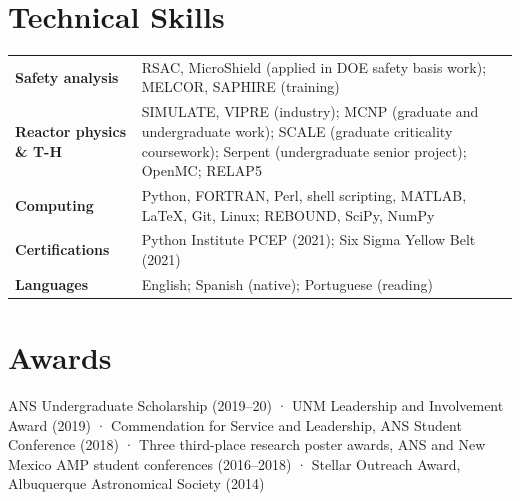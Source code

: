 \documentclass[10pt,letterpaper]{article}
\begin{document}
\section{Technical Skills}
\begin{tabularx}{\linewidth}{@{}lX@{}}
\textbf{Safety analysis} & RSAC, MicroShield (applied in DOE safety basis work); MELCOR, SAPHIRE (training)\\
\textbf{Reactor physics \& T-H} & SIMULATE, VIPRE (industry); MCNP (graduate and undergraduate work); SCALE (graduate criticality coursework); Serpent (undergraduate senior project); OpenMC; RELAP5\\
\textbf{Computing} & Python, FORTRAN, Perl, shell scripting, MATLAB, LaTeX, Git, Linux; REBOUND, SciPy, NumPy\\
\textbf{Certifications} & Python Institute PCEP (2021); Six Sigma Yellow Belt (2021)\\
\textbf{Languages} & English; Spanish (native); Portuguese (reading)\\
\end{tabularx}

\section{Awards}
ANS Undergraduate Scholarship (2019--20) · UNM Leadership and Involvement Award (2019) · Commendation for Service and Leadership, ANS Student Conference (2018) · Three third-place research poster awards, ANS and New Mexico AMP student conferences (2016--2018) · Stellar Outreach Award, Albuquerque Astronomical Society (2014)
\end{document}
